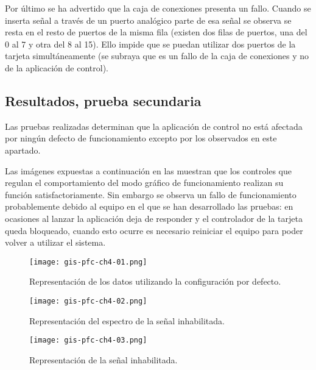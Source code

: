 Por último se ha advertido que la caja de conexiones presenta un fallo.
Cuando se inserta señal a través de un puerto analógico parte de esa señal
se observa se resta en el resto de puertos de la misma fila (existen dos
filas de puertos, una del 0 al 7 y otra del 8 al 15). Ello impide que se
puedan utilizar dos puertos de la tarjeta simultáneamente (se subraya que
es un fallo de la caja de conexiones y no de la aplicación de control).


\subsection{Resultados, prueba secundaria}

Las pruebas realizadas determinan que la aplicación de control no está
afectada por ningún defecto de funcionamiento excepto por los observados en
este apartado.

Las imágenes expuestas a continuación en las
 muestran que los controles que
regulan el comportamiento del modo gráfico de funcionamiento realizan su
función satisfactoriamente. Sin embargo se observa un fallo de
funcionamiento probablemente debido al equipo en el que se han desarrollado
las pruebas: en ocasiones al lanzar la aplicación \matlab{} deja de
responder y el controlador de la tarjeta queda bloqueado, cuando esto
ocurre es necesario reiniciar el equipo para poder volver a utilizar el
sistema.

\begin{figure}
    \begin{center}
	\texttt{[image: gis-pfc-ch4-01.png]}
    \end{center}
    \caption[Configuración por defecto]{Representación de los datos
    utilizando la configuración por defecto.}
    \label{fig:default}
\end{figure}

\begin{figure}[p]
    \begin{center}
	\texttt{[image: gis-pfc-ch4-02.png]}
    \end{center}
    \caption[Representación del espectro de la señal
    inhabilitada]{Representación del espectro de la señal inhabilitada.}
    \label{fig:specter-disabled}
\end{figure}

\begin{figure}[p]
    \begin{center}
	\texttt{[image: gis-pfc-ch4-03.png]}
    \end{center}
    \caption[Representación de la señal inhabilitada]{Representación de la
    señal inhabilitada.}
    \label{fig:signal-disabled}
\end{figure}


